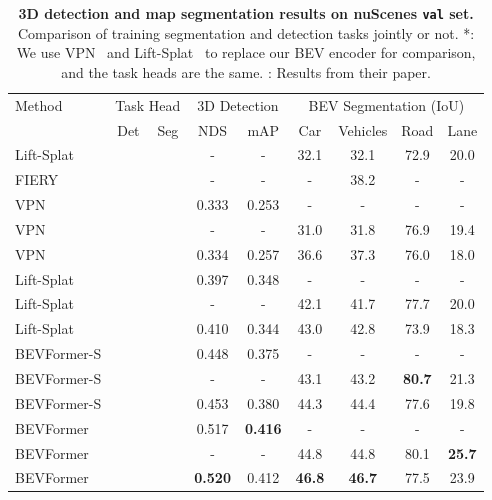 \documentclass{article}
\newcommand{\cmark}{\ding{51}}\newcommand{\xmark}{\ding{55}}\definecolor{gray9}{gray}{.9}
\begin{document}
\begin{table}[t] 
\begin{center}

\caption{
\textbf{3D detection and map segmentation results on nuScenes \texttt{val} set.}
Comparison of training segmentation and detection tasks jointly or not.
*: We use VPN~\cite{pan2020cross} and Lift-Splat~\cite{philion2020lift} to replace our BEV encoder for comparison, and the task heads are the same. : Results from their paper.
}

\setlength{\tabcolsep}{2.9mm}
\begin{tabular}{l| c c | c c | c c c c }
\toprule
\multirow{2}{*}{Method}& \multicolumn{2}{c|}{Task Head}
 & \multicolumn{2}{c|}{3D Detection} & \multicolumn{4}{c}{BEV Segmentation (IoU)} \\
&Det& Seg& NDS &mAP  & Car & Vehicles & Road & Lane\\
\midrule
Lift-Splat~\cite{philion2020lift} &\xmark &\cmark &- &-& 32.1 & 32.1 & 72.9 &20.0\\
FIERY~\cite{hu2021fiery}&\xmark &  \cmark& - &-&- & 38.2 & - & -\\
\midrule
VPN~\cite{pan2020cross} & \cmark & \xmark & 0.333 & 0.253   &- & - &- &-\\
VPN &\xmark &\cmark & - & -  & 31.0 & 31.8 &76.9 &19.4 \\
VPN &\cmark & \cmark& 0.334 & 0.257  &36.6 & 37.3 & 76.0 & 18.0\\
Lift-Splat& \cmark &\xmark & 0.397 & 0.348  & -&-&-&-\\
Lift-Splat &\xmark &\cmark &- &- &42.1 & 41.7 &77.7 & 20.0 \\
Lift-Splat& \cmark & \cmark&  0.410 & 0.344&  43.0 & 42.8 & 73.9 & 18.3\\
\rowcolor{gray95}
BEVFormer-S&\cmark & \xmark & 0.448 & 0.375&  -& - & - & -\\
\rowcolor{gray95}
BEVFormer-S& \xmark& \cmark  &- &-&43.1  &43.2  &\textbf{80.7} &21.3 \\
\rowcolor{gray95}
BEVFormer-S&\cmark & \cmark & 0.453 & 0.380 &  44.3& 44.4 & 77.6 & 19.8\\

\rowcolor{gray9}
BEVFormer&  \cmark  &\xmark & 0.517 & \textbf{0.416} &- & - & - & -\\
\rowcolor{gray9}
BEVFormer&\xmark & \cmark& - &-&44.8 & 44.8 & 80.1 & \textbf{25.7}\\
\rowcolor{gray9}
BEVFormer&\cmark & \cmark & \textbf{0.520} & 0.412 & \textbf{46.8} & \textbf{46.7} & 77.5 & 23.9\\

\bottomrule


\end{tabular} \label{table:multi-tasks}
\end{center}
\end{table}
\end{document}
